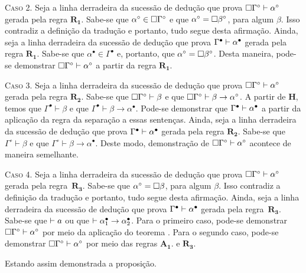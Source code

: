 \begin{tcolorbox}[enhanced jigsaw, breakable, sharp corners, colframe=black, colback=white, boxrule=0.5pt, left=1.5mm, right=1.5mm, top=1.5mm, bottom=1.5mm]
    \vspace{.5\baselineskip}
    \textsc{Caso 2.}
    Seja a linha derradeira da sucessão de dedução que prova $\Box\Gamma^\circ\mathrel{\vdash}\alpha^\circ$ gerada pela regra $\hyperref[modal.rule.2]{\mathbf{R_1}}$.
    Sabe-se que $\alpha^\circ\in\Box\Gamma^\circ$ e que $\alpha^\circ=\Box\beta^\circ$, para algum $\beta$.
    Isso contradiz a definição da tradução e portanto, tudo segue desta afirmação.
    Ainda, seja a linha derradeira da sucessão de dedução que prova $\Gamma^\bullet\mathrel{\vdash}\alpha^\bullet$ gerada pela regra $\hyperref[modal.rule.2]{\mathbf{R_1}}$.
    Sabe-se que $\alpha^\bullet\in\Gamma^\bullet$ e, portanto, que $\alpha^\circ=\Box\beta^\circ$.
    Desta maneira, pode-se demonstrar $\Box\Gamma^\circ\mathrel{\vdash}\alpha^\circ$ a partir da regra $\hyperref[modal.rule.2]{\mathbf{R_1}}$.

    \vspace{.5\baselineskip}
    \textsc{Caso 3.}
    Seja a linha derradeira da sucessão de dedução que prova $\Box\Gamma^\circ\mathrel{\vdash}\alpha^\circ$ gerada pela regra $\hyperref[modal.rule.2]{\mathbf{R_2}}$.
    Sabe-se que $\Box\Gamma^\circ\vdash\beta$ e que $\Box\Gamma^\circ\vdash\beta\to\alpha^\circ$.
    A partir de $\mathbf{H}$, temos que $\Gamma^\bullet\vdash\beta$ e que $\Gamma^\bullet\vdash\beta\to\alpha^\bullet$.
    Pode-se demonstrar que $\Gamma^\bullet\mathrel{\vdash}\alpha^\bullet$ a partir da aplicação da regra da separação a essas sentenças.
    Ainda, seja a linha derradeira da sucessão de dedução que prova $\Gamma^\bullet\mathrel{\vdash}\alpha^\bullet$ gerada pela regra $\hyperref[modal.rule.2]{\mathbf{R_2}}$.
    Sabe-se que $\Gamma^\circ\vdash\beta$ e que $\Gamma^\circ\vdash\beta\to\alpha^\bullet$.
    Deste modo, demonstração de $\Box\Gamma^\circ\mathrel{\vdash}\alpha^\circ$ acontece de maneira semelhante.

    \vspace{.5\baselineskip}
    \textsc{Caso 4.}
    Seja a linha derradeira da sucessão de dedução que prova $\Box\Gamma^\circ\mathrel{\vdash}\alpha^\circ$ gerada pela regra~$\hyperref[modal.rule.3]{\mathbf{R_3}}$.
    Sabe-se que $\alpha^\circ=\Box\beta$, para algum $\beta$.
    Isso contradiz a definição da tradução e portanto, tudo segue desta afirmação.
    Ainda, seja a linha derradeira da sucessão de dedução que prova $\Gamma^\bullet\mathrel{\vdash}\alpha^\bullet$ gerada pela regra~$\hyperref[modal.rule.3]{\mathbf{R_3}}$.
    Sabe-se que $\mathrel{\vdash} a$ ou que $\mathrel{\vdash}\alpha_1^\bullet\to\alpha_2^\bullet$.
    Para o primeiro caso, pode-se demonstrar $\Box\Gamma^\circ\mathrel{\vdash}\alpha^\circ$ por meio da aplicação do teorema .
    Para o segundo caso, pode-se demonstrar $\Box\Gamma^\circ\mathrel{\vdash}\alpha^\circ$ por meio das regras $\hyperref[modal.axiom.1]{\mathbf{A_1}}$. e $\hyperref[modal.rule.3]{\mathbf{R_3}}$.

    \vspace{.5\baselineskip}
    Estando assim demonstrada a proposição.
\end{tcolorbox}
